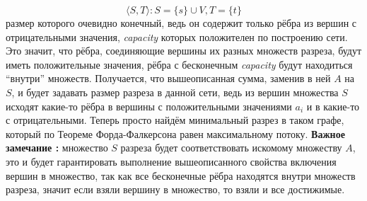 \documentclass{article}
\theoremstyle{plain}
\theoremstyle{remark}
\theoremstyle{definition}
\begin{document}
    $$ \langle S, T \rangle : S = \{s\} \cup V, T = \{t\}$$ 
    размер которого очевидно конечный, ведь он содержит только рёбра из вершин с отрицательными значения, \textit{capacity} которых положителен по построению сети. Это значит, что рёбра, соединяющие вершины их разных множеств разреза, будут иметь положительные значения, рёбра с бесконечным \textit{capacity} будут находиться ``внутри'' множеств. Получается, что вышеописанная сумма, заменив в ней $A$ на $S$, и будет задавать размер разреза в данной сети, ведь из вершин множества $S$ исходят какие-то рёбра в вершины с положительными значениями $a_i$ и в какие-то с отрицательными.
    \newline
    Теперь просто найдём минимальный разрез в таком графе, который по Теореме Форда-Фалкерсона равен максимальному потоку.\newline
    \textbf{Важное замечание :} множество $S$ разреза будет соответствовать искомому множеству $A$, это и будет гарантировать выполнение вышеописанного свойства включения вершин в множество, так как все бесконечные рёбра находятся внутри множеств разреза, значит если взяли вершину в множество, то взяли и все достижимые.
\end{document}
